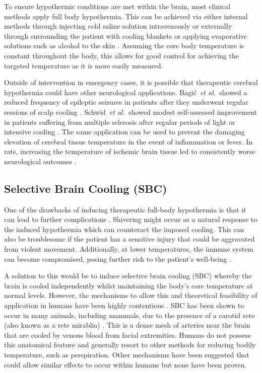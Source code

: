 \documentclass[11pt,english,a4paper,twoside,openright]{report}
\begin{document}
{{{{{{{{	To ensure hypothermic conditions are met within the brain, most clinical methods apply full body hypothermia. This can be achieved via either internal methods through injecting cold saline solution intravenously \cite{bernard2003induced} or externally through surrounding the patient with cooling blankets or applying evaporative solutions such as alcohol to the skin \cite{polderman2004application}. Assuming the core body temperature is constant throughout the body, this allows for good control for achieving the targeted temperature as it is more easily measured. 
	
	Outside of intervention in emergency cases, it is possible that therapeutic cerebral hypothermia could have other neurological applications. Bagi{\'c}~\textit{et al.\ }showed a reduced frequency of epileptic seizures in patients after they underwent regular sessions of scalp cooling \cite{bagic2008towards}. Schwid~\textit{et al.\ }showed modest self-assessed improvement in patients suffering from multiple sclerosis after regular periods of light or intensive cooling \cite{schwid2003randomized}. The same application can be used to prevent the damaging elevation of cerebral tissue temperature in the event of inflammation or fever. In rats, increasing the temperature of ischemic brain tissue led to consistently worse neurological outcomes \cite{busto1987small}.
	
	\subsection{Selective Brain Cooling (SBC)}
	
	One of the drawbacks of inducing therapeutic full-body hypothermia is that it can lead to further complications \cite{karnatovskaia2014therapeutic}. Shivering might occur as a natural response to the induced hypothermia which can counteract the imposed cooling. This can also be troublesome if the patient has a sensitive injury that could be aggravated from violent movement. Additionally, at lower temperatures, the immune system can become compromised, posing further risk to the patient's well-being \cite{soleimanpour2014main}. 
	
	A solution to this would be to induce selective brain cooling (SBC) whereby the brain is cooled independently whilst maintaining the body's core temperature at normal levels. However, the mechanisms to allow this and theoretical feasibility of application in humans have been highly contentious \cite{white2011point}\cite{nybo2011counterpoint}. SBC has been shown to occur in many animals, including mammals, due to the presence of a carotid rete (also known as a rete mirablia) \cite{jessen2001selective}. This is a dense mesh of arteries near the brain that are cooled by venous blood from facial extremities. Humans do not possess this anatomical feature and generally resort to other methods for reducing bodily temperature, such as perspiration. Other mechanisms have been suggested that could allow similar effects to occur within humans but none have been proven. 
	
}}}}}}}}
\end{document}
